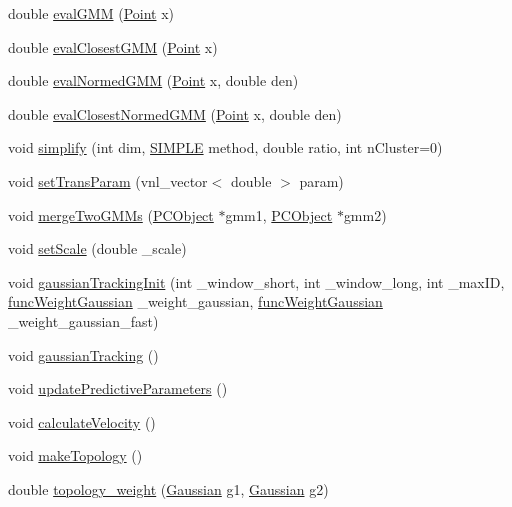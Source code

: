 \begin{DoxyCompactItemize}
double \hyperlink{class_p_c_object_a265bc3d88852829822e2954cd7453651}{eval\-G\-M\-M} (\hyperlink{class_point}{\-Point} x)
\item 
double \hyperlink{class_p_c_object_ad64e95414d9c60db29986e4408d64278}{eval\-Closest\-G\-M\-M} (\hyperlink{class_point}{\-Point} x)
\item 
double \hyperlink{class_p_c_object_ae9982821fa0ba9e4f3ae4566dcf535f1}{eval\-Normed\-G\-M\-M} (\hyperlink{class_point}{\-Point} x, double den)
\item 
double \hyperlink{class_p_c_object_a03ee69cf00009002b2868fb91b697116}{eval\-Closest\-Normed\-G\-M\-M} (\hyperlink{class_point}{\-Point} x, double den)
\item 
void \hyperlink{class_p_c_object_a50ee001efcde0b94846e8fbcf8302fb6}{simplify} (int dim, \hyperlink{pcobject_8h_a41767bf2343b5367995c795ada4b6946}{\-S\-I\-M\-P\-L\-E} method, double ratio, int n\-Cluster=0)
\item 
void \hyperlink{class_p_c_object_aad9af1a35617123738d53e1abc80980b}{set\-Trans\-Param} (vnl\-\_\-vector$<$ double $>$ param)
\item 
void \hyperlink{class_p_c_object_a2d282f88c1e9412c7e73cad48690a439}{merge\-Two\-G\-M\-Ms} (\hyperlink{class_p_c_object}{\-P\-C\-Object} $\ast$gmm1, \hyperlink{class_p_c_object}{\-P\-C\-Object} $\ast$gmm2)
\item 
void \hyperlink{class_p_c_object_a3a765ed1df3f4997c7255da3bd53ad6f}{set\-Scale} (double \-\_\-scale)
\item 
void \hyperlink{class_p_c_object_ac085f8a5dc44cfa8f4e4d2d1a9aeacd5}{gaussian\-Tracking\-Init} (int \-\_\-window\-\_\-short, int \-\_\-window\-\_\-long, int \-\_\-max\-I\-D, \hyperlink{class_p_c_object_a57717df0ff6fbc92e693c08485479da3}{func\-Weight\-Gaussian} \-\_\-weight\-\_\-gaussian, \hyperlink{class_p_c_object_a57717df0ff6fbc92e693c08485479da3}{func\-Weight\-Gaussian} \-\_\-weight\-\_\-gaussian\-\_\-fast)
\item 
void \hyperlink{class_p_c_object_a0631fbfafe8050f758c14f0b3791fa01}{gaussian\-Tracking} ()
\item 
void \hyperlink{class_p_c_object_ae117d9276dd14490027029e8b87e150f}{update\-Predictive\-Parameters} ()
\item 
void \hyperlink{class_p_c_object_acfdd2146d888b9d30e7fde9ea6a0727e}{calculate\-Velocity} ()
\item 
void \hyperlink{class_p_c_object_ad14e7453287b842ce8dced26c63d2899}{make\-Topology} ()
\item 
double \hyperlink{class_p_c_object_ae3eaf96866c11430868e643d7fa56eb9}{topology\-\_\-weight} (\hyperlink{class_gaussian}{\-Gaussian} g1, \hyperlink{class_gaussian}{\-Gaussian} g2)

\end{DoxyCompactItemize}

